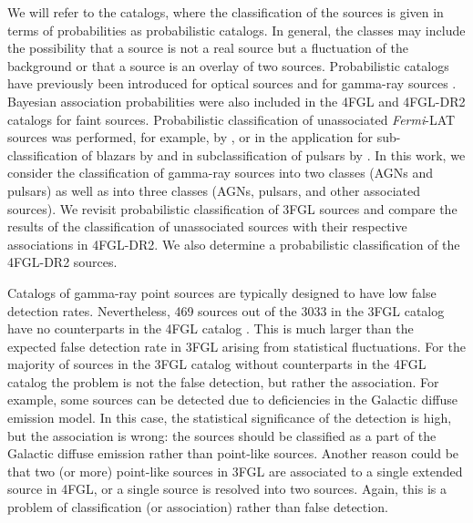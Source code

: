 \documentclass{aa}
\newcommand{\Fermi}{\textit{Fermi}\xspace}
\begin{document}
We will refer to the catalogs, where the classification of the sources is given in terms of probabilities as probabilistic catalogs.
In general, the classes may include the possibility that a source is not a real source but a fluctuation of the background 
\citep{2021A&A...656A..62P}
or that a source is an overlay of two sources.
Probabilistic catalogs
have previously been introduced for optical sources 
\citep[e.g.,][]{2010EAS....45..351H, 2013AJ....146....7B}
and for gamma-ray sources \citep{2017ApJ...839....4D}.
Bayesian association probabilities were also included in the 4FGL \citep{2020ApJS..247...33A} and
4FGL-DR2 \citep{2020arXiv200511208B} catalogs for faint sources.
Probabilistic classification of unassociated \Fermi-LAT sources was performed, for example, by
\cite{2012ApJ...753...83A, 2016ApJ...820....8S, 2016ApJ...825...69M, 2017A&A...602A..86L, 2020MNRAS.492.5377L, 
2021MNRAS.507.4061F, 2021RAA....21...15Z},
or in the application for sub-classification of blazars by
\cite{2013MNRAS.428..220H, 2014ApJ...782...41D, 2016MNRAS.462.3180C, 2017MNRAS.470.1291S, 2019MNRAS.490.4770K, 2020MNRAS.493.1926K}
and in subclassification of pulsars by \cite{2012MNRAS.424.2832L, 2016ApJ...820....8S}.
In this work, we consider the classification of gamma-ray sources into two classes (AGNs and pulsars) as well as into three classes 
(AGNs, pulsars, and other associated sources).
We revisit probabilistic classification of 3FGL sources and compare the results of the classification of unassociated sources
with their respective associations in 4FGL-DR2.
We also determine a probabilistic classification of the 4FGL-DR2 sources.


Catalogs of gamma-ray point sources are typically designed to have low false detection rates. 
Nevertheless, 469 sources out of the 3033 in the 3FGL catalog \citep{2015ApJS..218...23A} have no counterparts 
in the 4FGL catalog \citep{2020ApJS..247...33A}.
This is much larger than the expected false detection rate in 3FGL arising from statistical fluctuations.
For the majority of sources in the 3FGL catalog without counterparts in the 4FGL catalog the problem is not the false detection, 
but rather the association.
For example, some sources can be detected due to deficiencies in the Galactic diffuse emission model.
In this case, the statistical significance of the detection is high, but the association is wrong: the sources should be classified as
a part of the Galactic diffuse emission rather than point-like sources.
Another reason could be that two (or more) point-like sources in 3FGL are associated to a single extended source in 4FGL,
or a single source is resolved into two sources.
Again, this is a problem of classification (or association) rather than false detection.
\end{document}
